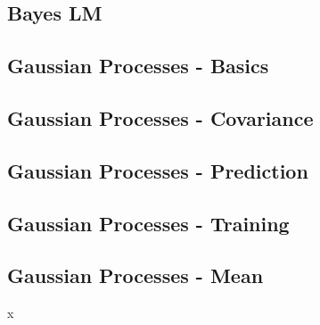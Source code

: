

\subsection{Bayes LM}


\subsection{Gaussian Processes - Basics}

\subsection{Gaussian Processes - Covariance}

\subsection{Gaussian Processes - Prediction}

\subsection{Gaussian Processes - Training}

\subsection{Gaussian Processes - Mean}

x
